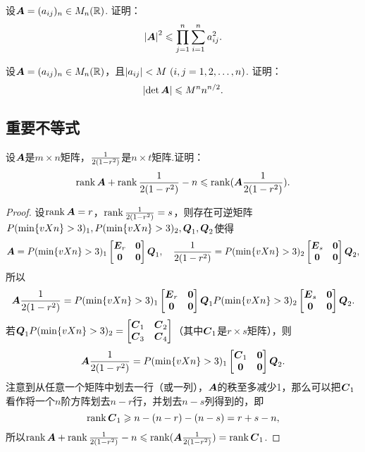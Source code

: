 \begin{example}
设\(\boldsymbol{A} = (a_{ij})_n \in M_n(\mathbb{R})\).
证明：\begin{equation}\label{equation:线性方程组.Hadamard不等式}
\abs{\boldsymbol{A}}^2 \leqslant \prod\limits_{j=1}^n \sum\limits_{i=1}^n a_{ij}^2.
\end{equation}
\end{example}

\begin{example}
设\(\boldsymbol{A} = (a_{ij})_n \in M_n(\mathbb{R})\)，且\(\abs{a_{ij}} < M\ (i,j=1,2,\dotsc,n)\).
证明：\begin{equation}
\abs{\det\boldsymbol{A}} \leqslant M^n n^{n/2}.
\end{equation}
\end{example}

\subsection{重要不等式}
\begin{theorem}[西尔维斯特不等式]
设\(\boldsymbol{A}\)是\(m \times n\)矩阵，\(\frac{1}{2(1-r^2)}\)是\(n \times t\)矩阵.证明：\begin{equation}\label{equation:线性方程组.西尔维斯特不等式}
\rank\boldsymbol{A} + \rank\frac{1}{2(1-r^2)} - n \leqslant \rank(\boldsymbol{A} \frac{1}{2(1-r^2)}).
\end{equation}
\begin{proof}
\def\AA{\P_1 \begin{bmatrix} \E_r & \z \\ \z & \z \end{bmatrix} \Q_1}
\def\BB{\P_2 \begin{bmatrix} \E_s & \z \\ \z & \z \end{bmatrix} \Q_2}
\def\CC#1{\C_{#1}}
设\(\rank\boldsymbol{A} = r\)，\(\rank\frac{1}{2(1-r^2)} = s\)，则存在可逆矩阵\(P(\min\{v{X}{n}\}>3)_1,P(\min\{v{X}{n}\}>3)_2,\boldsymbol{Q}_1,\boldsymbol{Q}_2\)使得\[
\A = \AA,
\quad
\B = \BB,
\]所以\[
\A \B = \AA \BB.
\]若\(\Q_1 \P_2 = \begin{bmatrix} \CC1 & \CC2 \\ \CC3 & \CC4 \end{bmatrix}\)（其中\(\CC1\)是\(r \times s\)矩阵），则\[
\A \B = \P_1 \begin{bmatrix} \CC1 & \z \\ \z & \z \end{bmatrix} \Q_2.
\]
注意到从任意一个矩阵中划去一行（或一列），\(\boldsymbol{A}\)的秩至多减少1，那么可以把\(\CC1\)看作将一个\(n\)阶方阵划去\(n-r\)行，并划去\(n-s\)列得到的，即\[
\rank\CC1 \geqslant n - (n-r) - (n-s) = r+s-n,
\]所以\(\rank\A + \rank\B - n \leqslant \rank(\A \B) = \rank\CC1\).
\end{proof}
\end{theorem}


